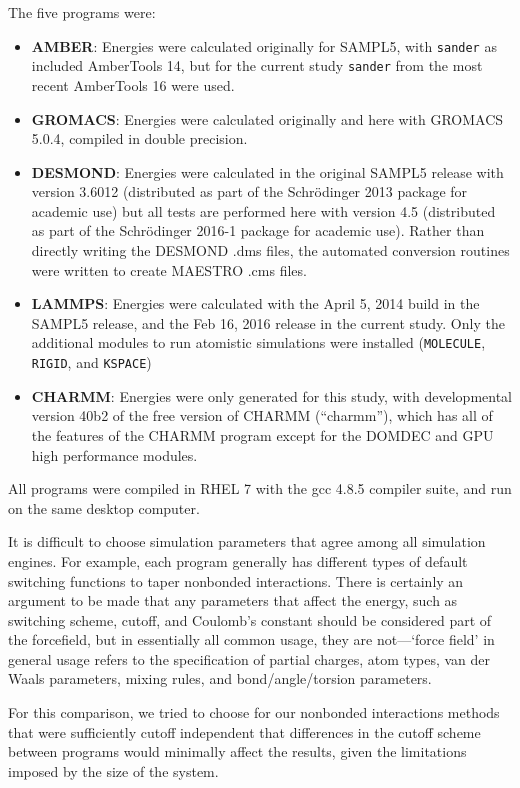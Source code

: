 The five programs were:
\begin{itemize} 
\item {\bf AMBER}: Energies were calculated originally for SAMPL5, with
  {\tt sander} as included AmberTools 14, but for the current study
  {\tt sander} from the most recent AmberTools 16 were used.
\item {\bf GROMACS}: Energies were calculated originally and here with
  GROMACS 5.0.4, compiled in double precision.
\item {\bf DESMOND}: Energies were calculated in the original
  SAMPL5 release with version 3.6012 (distributed as part of the Schr\"odinger
  2013 package for academic use) but all tests are performed here with
  version 4.5 (distributed as part of the Schr\"odinger
  2016-1 package for academic use).  Rather than directly writing the
  DESMOND .dms files, the automated conversion routines were written to
  create MAESTRO .cms files.
\item {\bf LAMMPS}: Energies were calculated with the April 5,
  2014 build in the SAMPL5 release, and the Feb 16, 2016 release in
  the current study. Only the additional modules to run atomistic
  simulations were installed ({\tt MOLECULE}, {\tt RIGID}, and {\tt KSPACE})
\item {\bf CHARMM}: Energies were only generated for this study, with
  developmental version 40b2 of the free version of CHARMM (``charmm''), which has all of the features of the CHARMM program except for the DOMDEC and GPU high performance modules.
\end{itemize}
All programs were compiled in RHEL 7 with the gcc 4.8.5 compiler
suite, and run on the same desktop computer.

It is difficult to choose simulation parameters that agree among all
simulation engines. For example, each program generally has different
types of default switching functions to taper nonbonded
interactions. There is certainly an argument to be made that any
parameters that affect the energy, such as switching scheme, cutoff,
and Coulomb's constant should be considered part of the forcefield,
but in essentially all common usage, they are not---`force field' in
general usage refers to the specification of partial charges, atom
types, van der Waals parameters, mixing rules, and bond/angle/torsion
parameters.

For this comparison, we tried to choose for our nonbonded
interactions methods that were sufficiently cutoff independent that
differences in the cutoff scheme between programs would minimally
affect the results, given the limitations imposed by the size of the
system.

